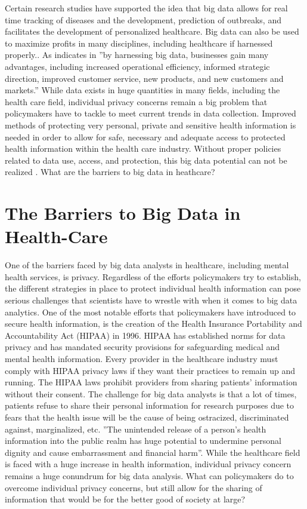 \documentclass[sigconf]{acmart}
\begin{document}
Certain research studies have supported the idea that big data allows for real time tracking of diseases and the development, prediction of outbreaks, and facilitates the development of personalized healthcare. Big data can also be used to maximize profits in many disciplines, including healthcare if harnessed properly.\cite{van2011health}. As indicates in \cite{khan2014big} ''by harnessing big data, businesses gain many advantages, including increased operational efficiency, informed strategic direction, improved customer service, new products, and new customers and markets.'' While data exists in huge quantities in many fields, including the health care field, individual privacy concerns remain a big problem that policymakers have to tackle to meet current trends in data collection. Improved methods of protecting very personal, private and sensitive health information is needed in order to allow for safe, necessary and adequate access to protected health information within the health care industry. Without proper policies related to data use, access, and protection, this big data potential can not be realized \cite{roski2014creating}. What are the barriers to big data in heathcare? 

\section{The Barriers to Big Data in Health-Care}

One of the barriers faced by big data analysts in healthcare, including mental health services, is privacy. Regardless of the efforts policymakers try to establish, the different strategies in place to protect individual health information can pose serious challenges that scientists have to wrestle with when it comes to big data analytics. One of the most notable efforts that policymakers have introduced to secure health information, is the creation of the Health Insurance Portability and Accountability Act (HIPAA) in 1996. HIPAA has established norms for data privacy and has mandated security provisions for safeguarding medical and mental health information. Every provider in the healthcare industry must comply with HIPAA privacy laws if they want their practices to remain up and running. The HIPAA laws prohibit providers from sharing patients' information without their consent. The challenge for big data analysts is that a lot of times, patients refuse to share their personal information for research purposes due to fears that the health issue will be the cause of being ostracized, discriminated against, marginalized, etc. ''The unintended release of a person's health information into the public realm has huge potential to undermine personal dignity and cause embarrassment and financial harm''\cite{van2011health}. While the healthcare field is faced with a huge increase in health information, individual privacy concern remains a huge conundrum for big data analysis. What can policymakers do to overcome individual privacy concerns, but still allow for the sharing of information that would be for the better good of society at large?
\end{document}
